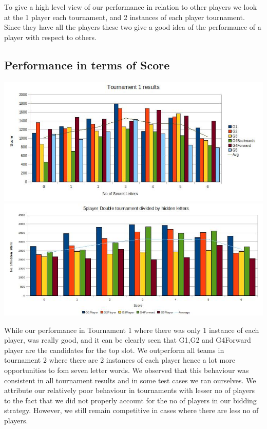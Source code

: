 \documentclass[11pt]{article}
\begin{document}
	To give a high level view of our performance in relation to other players we look at the 1 player each tournament, and 2 instances of each player tournament. Since they have all the players these two give a good idea of the performance of a player with respect to others. 
	
	\subsection{Performance in terms of Score}
	
	\includegraphics[width=1\textwidth]{T1Results}
	\includegraphics[width=1\textwidth]{T2Results}
	
	While our performance in Tournament 1 where there was only 1 instance of each player, was really good, and it can be clearly seen that G1,G2 and G4Forward player are the candidates for the top slot. We outperform all teams in tournament 2 where there are 2 instances of each player hence a lot more opportunities to fom seven letter words. We observed that this behaviour was consistent in all tournament results and in some test cases we ran ourselves. We attribute our relatively poor behaviour in tournaments with lesser no of players to the fact that we did not properly account for the no of players in our bidding strategy. However, we still remain competitive in cases where there are less no of players.
	
\end{document}
